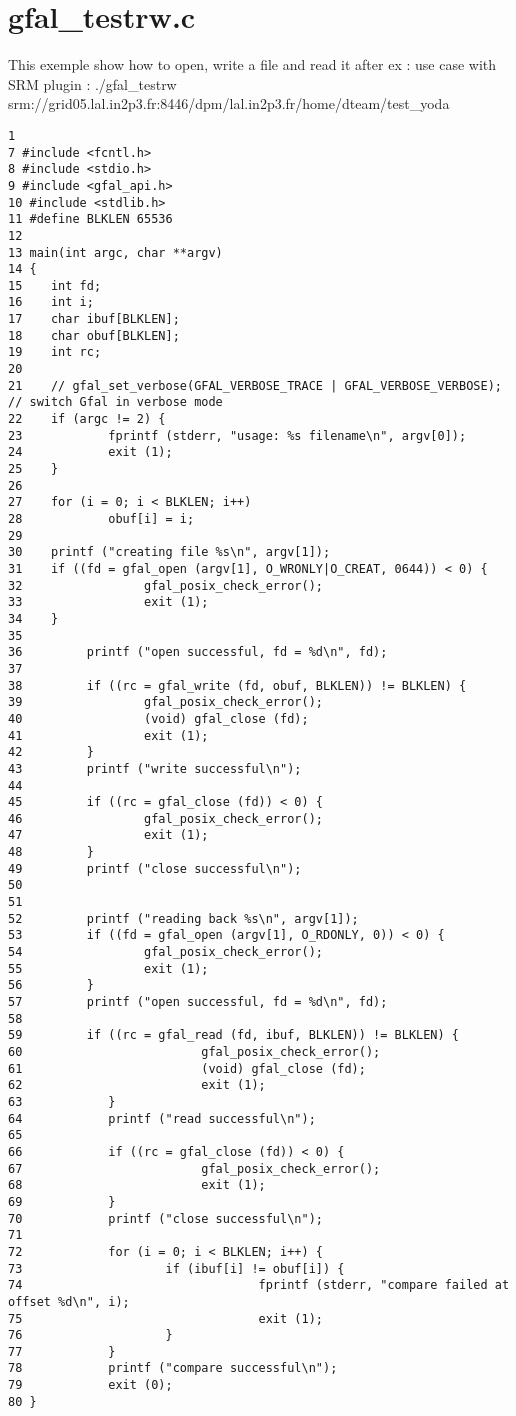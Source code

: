 \section{gfal\_\-testrw.c}
This exemple show how to open, write a file and read it after ex : use case with SRM plugin : ./gfal\_\-testrw srm://grid05.lal.in2p3.fr:8446/dpm/lal.in2p3.fr/home/dteam/test\_\-yoda



\begin{DocInclude}\begin{verbatim}1 
7 #include <fcntl.h>
8 #include <stdio.h>
9 #include <gfal_api.h>
10 #include <stdlib.h>
11 #define BLKLEN 65536
12 
13 main(int argc, char **argv)
14 {
15    int fd;
16    int i;
17    char ibuf[BLKLEN];
18    char obuf[BLKLEN];
19    int rc;
20 
21    // gfal_set_verbose(GFAL_VERBOSE_TRACE | GFAL_VERBOSE_VERBOSE);      // switch Gfal in verbose mode
22    if (argc != 2) {
23            fprintf (stderr, "usage: %s filename\n", argv[0]);
24            exit (1);
25    }
26 
27    for (i = 0; i < BLKLEN; i++)
28            obuf[i] = i;
29 
30    printf ("creating file %s\n", argv[1]);
31    if ((fd = gfal_open (argv[1], O_WRONLY|O_CREAT, 0644)) < 0) {
32                 gfal_posix_check_error();
33                 exit (1);
34    }
35    
36         printf ("open successful, fd = %d\n", fd);
37 
38         if ((rc = gfal_write (fd, obuf, BLKLEN)) != BLKLEN) {
39                 gfal_posix_check_error();
40                 (void) gfal_close (fd);
41                 exit (1);
42         }
43         printf ("write successful\n");
44 
45         if ((rc = gfal_close (fd)) < 0) {
46                 gfal_posix_check_error();
47                 exit (1);
48         }
49         printf ("close successful\n");
50 
51 
52         printf ("reading back %s\n", argv[1]);
53         if ((fd = gfal_open (argv[1], O_RDONLY, 0)) < 0) {
54                 gfal_posix_check_error();
55                 exit (1);
56         }
57         printf ("open successful, fd = %d\n", fd);
58 
59         if ((rc = gfal_read (fd, ibuf, BLKLEN)) != BLKLEN) {
60                         gfal_posix_check_error();
61                         (void) gfal_close (fd);
62                         exit (1);
63            }
64            printf ("read successful\n");
65 
66            if ((rc = gfal_close (fd)) < 0) {
67                         gfal_posix_check_error();
68                         exit (1);
69            }
70            printf ("close successful\n");
71 
72            for (i = 0; i < BLKLEN; i++) {
73                    if (ibuf[i] != obuf[i]) {
74                                 fprintf (stderr, "compare failed at offset %d\n", i);
75                                 exit (1);
76                    }
77            }
78            printf ("compare successful\n");
79            exit (0);
80 }
\end{verbatim}
\end{DocInclude}
 